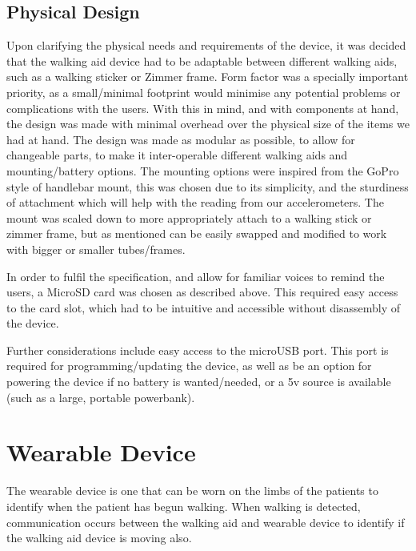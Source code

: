         \subsection{Physical Design}
        \label{subsec:Design Decisions}

            Upon clarifying the physical needs and requirements of the device, it was decided that the walking aid device had to be adaptable between different walking aids, such as a walking sticker or Zimmer frame. Form factor was a specially important priority, as a small/minimal footprint would minimise any potential problems or complications with the users. With this in mind, and with components at hand, the design was made with minimal overhead over the physical size of the items we had at hand. The design was made as modular as possible, to allow for changeable parts, to make it inter-operable different walking aids and mounting/battery options. The mounting options were inspired from the GoPro style of handlebar mount, this was chosen due to its simplicity, and the sturdiness of attachment which will help with the reading from our accelerometers. The mount was scaled down to more appropriately attach to a walking stick or zimmer frame, but as mentioned can be easily swapped and modified to work with bigger or smaller tubes/frames.

            In order to fulfil the specification, and allow for familiar voices to remind the users, a MicroSD card was chosen as described above. This required easy access to the card slot, which had to be intuitive and accessible without disassembly of the device.

            Further considerations include easy access to the microUSB port. This port is required for programming/updating the device, as well as be an option for powering the device if no battery is wanted/needed, or a 5v source is available (such as a large, portable powerbank).
            
    \section{Wearable Device}
    \label{sec:wearabledevice}

        The wearable device is one that can be worn on the limbs of the patients to identify when the patient has begun walking. When walking is detected, communication occurs between the walking aid and wearable device to identify if the walking aid device is moving also. 

